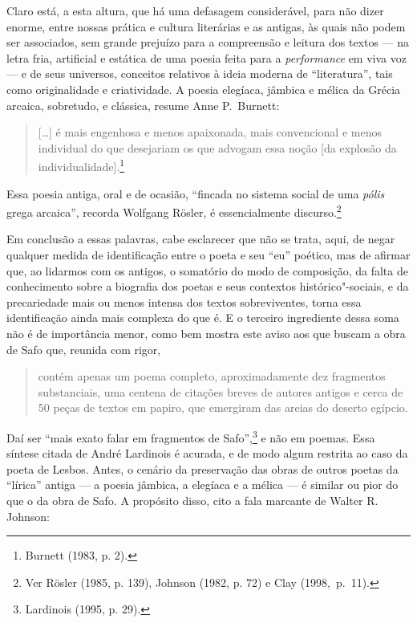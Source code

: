 Claro está, a esta altura, que há uma defasagem considerável, para não dizer
enorme, entre nossas prática e cultura literárias e as antigas, às quais não
podem ser associados, sem grande prejuízo para a compreensão e leitura dos
textos --- na letra fria, artificial e estática de uma poesia feita para a
\textit{performance} em viva voz --- e de seus universos, conceitos relativos à
ideia moderna de “literatura”, tais como originalidade e criatividade. A poesia
elegíaca, jâmbica e mélica da Grécia arcaica, sobretudo, e clássica, resume
Anne P.~Burnett: 

\begin{quote}
[\ldots{}] é mais engenhosa e menos apaixonada,
mais convencional e menos individual do que desejariam os que advogam essa noção [da explosão da individualidade].\footnote{ Burnett (1983, p. 2).} 
\end{quote}

Essa poesia antiga, oral e de
ocasião, “fincada no sistema social de uma \textit{pólis} grega arcaica”,
recorda Wolfgang Rösler, é essencialmente discurso.\footnote{ Ver
Rösler (1985, p. 139), Johnson (1982, p. 72) e Clay \mbox{(1998, p. 11)}.}

Em conclusão a essas palavras, cabe esclarecer que não se trata, aqui, de negar
qualquer medida de identificação entre o poeta e seu “eu” poético, mas de
afirmar que, ao lidarmos com os antigos, o somatório do modo de composição, da
falta de conhecimento sobre a biografia dos poetas e seus contextos
histórico"-sociais, e da precariedade mais ou menos intensa dos textos
sobreviventes, torna essa identificação ainda mais complexa do que é.
E o terceiro ingrediente dessa soma não é de importância menor, como
bem mostra este aviso aos que buscam a obra de Safo que, reunida com rigor,

\begin{quote}
contém apenas um poema completo, aproximadamente dez fragmentos substanciais,
uma centena de citações breves de autores antigos e cerca de 50 peças de textos
em papiro, que emergiram das areias do deserto egípcio.
\end{quote}

Daí ser “mais exato
falar em fragmentos de Safo”,\footnote{ Lardinois (1995, p. 29).} e não em
poemas. Essa síntese citada de André Lardinois é acurada, e de modo algum restrita ao
caso da poeta de Lesbos.
Antes, o cenário da preservação das obras de outros poetas da “lírica” antiga ---
a poesia jâmbica, a elegíaca e a mélica --- é similar ou pior do que
o da obra de Safo. A propósito disso, cito a fala marcante de Walter R. Johnson:

